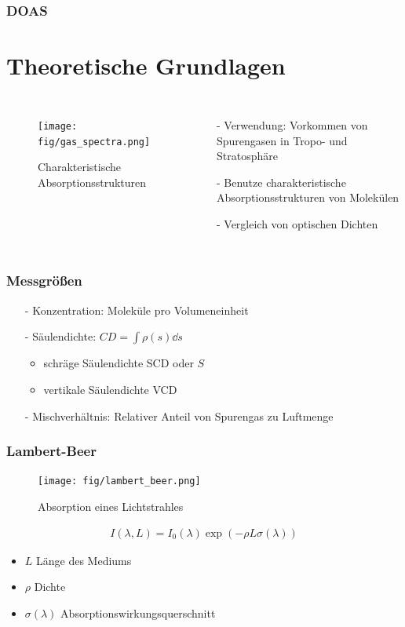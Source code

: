 \documentclass{beamer}
\begin{document}
\begin{frame}
    \frametitle{DOAS}
    \section{Theoretische Grundlagen}
    \begin{columns}

        \begin{figure}
        \texttt{[image: fig/gas\_spectra.png]}
        \caption{Charakteristische Absorptionsstrukturen \cite{atm_script}}
        \end{figure}
    
    \begin{itemize}
        \item[-] Verwendung: Vorkommen von Spurengasen in Tropo- und Stratosphäre
            \pause
        \item[-] Benutze charakteristische Absorptionsstrukturen von Molekülen
            \pause
        \item[-] Vergleich von optischen Dichten
    \end{itemize}
\end{columns}
\end{frame}

\begin{frame}
\frametitle{Messgrößen}
\begin{itemize}
    \item[-] Konzentration: Moleküle pro Volumeneinheit
        \pause
    \item[-] Säulendichte: $CD = \int \rho (s) \dd s$
        \begin{itemize}
            \item schräge Säulendichte SCD oder $S$
            \item vertikale Säulendichte VCD
        \end{itemize}
        \pause
    \item[-] Mischverhältnis: Relativer Anteil von Spurengas zu Luftmenge
    \end{itemize}
\end{frame}


\begin{frame}
    \frametitle{Lambert-Beer}
    \begin{figure}[h]
        \texttt{[image: fig/lambert\_beer.png]}
        \caption{Absorption eines Lichtstrahles \cite{atm_script}}
    \end{figure}
    \begin{align}
    	I(\lambda, L) = I_0 (\lambda) \exp (- \rho  L \sigma (\lambda) )
    \end{align}
    \begin{itemize}
        \item $L$ Länge des Mediums
        \item $\rho$ Dichte
        \item $\sigma (\lambda)$ Absorptionswirkungsquerschnitt %
    \end{itemize}
\end{frame}
\end{document}
